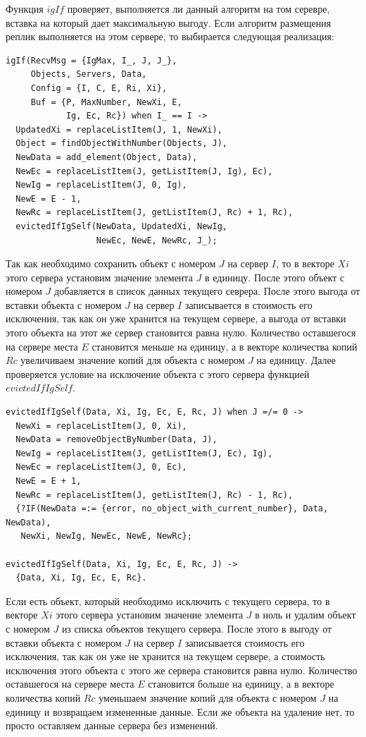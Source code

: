 			Функция $igIf$ проверяет, выполняется ли данный алгоритм на том серевре, вставка на который дает максимальную выгоду. Если алгоритм размещения реплик выполняется на этом сервере, то
			выбирается следующая реализация:
			\begin{lstlisting}
igIf(RecvMsg = {IgMax, I_, J, J_}, 
     Objects, Servers, Data,
     Config = {I, C, E, Ri, Xi},
     Buf = {P, MaxNumber, NewXi, E, 
            Ig, Ec, Rc}) when I_ == I ->
  UpdatedXi = replaceListItem(J, 1, NewXi),
  Object = findObjectWithNumber(Objects, J),
  NewData = add_element(Object, Data),    
  NewEc = replaceListItem(J, getListItem(J, Ig), Ec),
  NewIg = replaceListItem(J, 0, Ig),
  NewE = E - 1,
  NewRc = replaceListItem(J, getListItem(J, Rc) + 1, Rc),
  evictedIfIgSelf(NewData, UpdatedXi, NewIg,
                  NewEc, NewE, NewRc, J_);
			\end{lstlisting}
			Так как необходимо сохранить объект с номером $J$ на сервер $I$, то в векторе $Xi$ этого сервера установим значение элемента $J$ в единицу. После этого объект с номером $J$ добавляется 
			в список данных текущего севрера. После этого выгода от вставки объекта с номером $J$ на сервер $I$ записывается в стоимость его исключения, так как он уже хранится на текущем сервере,
			а выгода от вставки этого объекта на этот же сервер становится равна нулю. Количество оставшегося на сервере места $E$ становится меньше на единицу, а в векторе количества копий $Rc$
			увеличиваем значение копий для объекта с номером $J$ на единицу. Далее проверяется условие на исключение объекта с этого сервера функцией $evictedIfIgSelf$.
			\begin{lstlisting}
evictedIfIgSelf(Data, Xi, Ig, Ec, E, Rc, J) when J =/= 0 ->
  NewXi = replaceListItem(J, 0, Xi),
  NewData = removeObjectByNumber(Data, J),
  NewIg = replaceListItem(J, getListItem(J, Ec), Ig),
  NewEc = replaceListItem(J, 0, Ec),
  NewE = E + 1,
  NewRc = replaceListItem(J, getListItem(J, Rc) - 1, Rc),
  {?IF(NewData =:= {error, no_object_with_current_number}, Data, NewData), 
   NewXi, NewIg, NewEc, NewE, NewRc};
	
evictedIfIgSelf(Data, Xi, Ig, Ec, E, Rc, J) -> 
  {Data, Xi, Ig, Ec, E, Rc}.				
			\end{lstlisting}
			Если есть объект, который необходимо исключить с текущего сервера, то в векторе $Xi$ этого сервера установим значение элемента $J$ в ноль и удалим объект с номером $J$ из списка 
			объектов текущего сервера. После этого в выгоду от вставки объекта с номером $J$ на сервер $I$ записывается стоимость его исключения, так как он уже не хранится на текущем сервере,
			а стоимость исключения этого объекта с этого же сервера становится равна нулю. Количество оставшегося на сервере места $E$ становится больше на единицу, а в векторе количества копий 
			$Rc$ уменьшаем значение копий для объекта с номером $J$ на единицу и возвращаем измененные данные. Если же объекта на удаление нет, то просто оставляем данные сервера без изменений.

